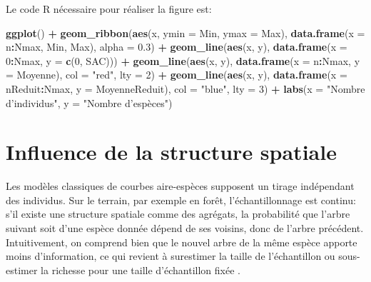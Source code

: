 \documentclass[
  11pt,
  french,
  a4paper,
  extrafontsizes,onecolumn,openright
  ]{memoir}
\newenvironment{Shaded}{\begin{snugshade}}{\end{snugshade}}
\newcommand{\DataTypeTok}[1]{\textcolor[rgb]{0.13,0.29,0.53}{#1}}
\newcommand{\DecValTok}[1]{\textcolor[rgb]{0.00,0.00,0.81}{#1}}
\newcommand{\FloatTok}[1]{\textcolor[rgb]{0.00,0.00,0.81}{#1}}
\newcommand{\KeywordTok}[1]{\textcolor[rgb]{0.13,0.29,0.53}{\textbf{#1}}}
\newcommand{\NormalTok}[1]{#1}
\newcommand{\OperatorTok}[1]{\textcolor[rgb]{0.81,0.36,0.00}{\textbf{#1}}}
\newcommand{\StringTok}[1]{\textcolor[rgb]{0.31,0.60,0.02}{#1}}
\begin{document}
Le code R nécessaire pour réaliser la figure est:

\scriptsize

\begin{Shaded}
\begin{Highlighting}[]
\KeywordTok{ggplot}\NormalTok{() }\OperatorTok{+}
\StringTok{  }\KeywordTok{geom_ribbon}\NormalTok{(}\KeywordTok{aes}\NormalTok{(x, }\DataTypeTok{ymin =}\NormalTok{ Min, }\DataTypeTok{ymax =}\NormalTok{ Max), }
              \KeywordTok{data.frame}\NormalTok{(}\DataTypeTok{x =}\NormalTok{ n}\OperatorTok{:}\NormalTok{Nmax, Min, Max), }\DataTypeTok{alpha =} \FloatTok{0.3}\NormalTok{) }\OperatorTok{+}
\StringTok{  }\KeywordTok{geom_line}\NormalTok{(}\KeywordTok{aes}\NormalTok{(x, y), }\KeywordTok{data.frame}\NormalTok{(}\DataTypeTok{x =} \DecValTok{0}\OperatorTok{:}\NormalTok{Nmax, }\DataTypeTok{y =} \KeywordTok{c}\NormalTok{(}\DecValTok{0}\NormalTok{, SAC))) }\OperatorTok{+}
\StringTok{  }\KeywordTok{geom_line}\NormalTok{(}\KeywordTok{aes}\NormalTok{(x, y), }\KeywordTok{data.frame}\NormalTok{(}\DataTypeTok{x =}\NormalTok{ n}\OperatorTok{:}\NormalTok{Nmax, }\DataTypeTok{y =}\NormalTok{ Moyenne), }
            \DataTypeTok{col =} \StringTok{"red"}\NormalTok{, }\DataTypeTok{lty =} \DecValTok{2}\NormalTok{) }\OperatorTok{+}
\StringTok{  }\KeywordTok{geom_line}\NormalTok{(}\KeywordTok{aes}\NormalTok{(x, y), }\KeywordTok{data.frame}\NormalTok{(}\DataTypeTok{x =}\NormalTok{ nReduit}\OperatorTok{:}\NormalTok{Nmax, }\DataTypeTok{y =}\NormalTok{ MoyenneReduit), }
            \DataTypeTok{col =} \StringTok{"blue"}\NormalTok{, }\DataTypeTok{lty =} \DecValTok{3}\NormalTok{) }\OperatorTok{+}
\StringTok{  }\KeywordTok{labs}\NormalTok{(}\DataTypeTok{x =} \StringTok{"Nombre d'individus"}\NormalTok{, }\DataTypeTok{y =} \StringTok{"Nombre d'espèces"}\NormalTok{)}
\end{Highlighting}
\end{Shaded}

\normalsize

\hypertarget{influence-de-la-structure-spatiale}{%
\section{Influence de la structure spatiale}\label{influence-de-la-structure-spatiale}}

Les modèles classiques de courbes aire-espèces supposent un tirage indépendant des individus.
Sur le terrain, par exemple en forêt, l'échantillonnage est continu: s'il existe une structure spatiale comme des agrégats, la probabilité que l'arbre suivant soit d'une espèce donnée dépend de ses voisins, donc de l'arbre précédent.
Intuitivement, on comprend bien que le nouvel arbre de la même espèce apporte moins d'information, ce qui revient à surestimer la taille de l'échantillon ou sous-estimer la richesse pour une taille d'échantillon fixée \autocite{Veech2005}.
\end{document}
